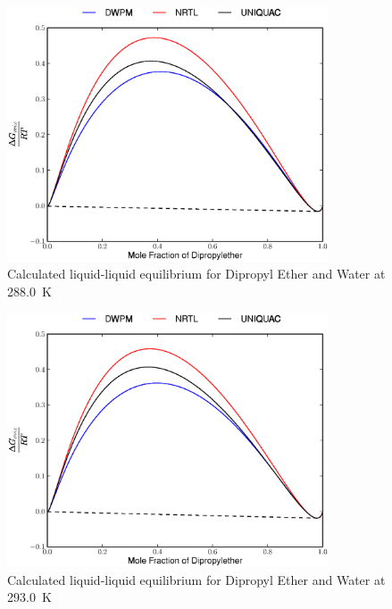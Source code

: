 \begin{figure}[hp]
\centering
\includegraphics[width = 0.85\textwidth]{Results_Parts/BinaryParams/dipropylether-water/AllModelsGibbsPlots/T_288.eps}
\caption{Calculated liquid-liquid equilibrium for Dipropyl Ether and Water at 288.0~$\mathrm{K}$} 
\end{figure}

\begin{figure}[hp]
\centering
\includegraphics[width = 0.85\textwidth]{Results_Parts/BinaryParams/dipropylether-water/AllModelsGibbsPlots/T_293.eps}
\caption{Calculated liquid-liquid equilibrium for Dipropyl Ether and Water at 293.0~$\mathrm{K}$} 
\end{figure}

